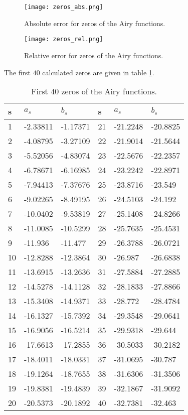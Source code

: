 \documentclass[10pt,a4paper,twocolumn]{article}
\begin{document}
\begin{figure}[h]
\centering
\captionsetup{justification=centering}
\texttt{[image: zeros\_abs.png]}
\caption{Absolute error for zeros of the Airy functions.}
\label{fig:zeros_abs}
\end{figure}

\begin{figure}[h]
\centering
\captionsetup{justification=centering}
\texttt{[image: zeros\_rel.png]}
\caption{Relative error for zeros of the Airy functions.}
\label{fig:zeros_rel}
\end{figure}

The first $40$ calculated zeros are given in table \ref{tab:vals}.

\begin{table}
\begin{tabular}{|l|l|l||l|l|l|}
\hline
s & $a_s$ & $b_s$ & s & $a_s$ & $b_s$\\ \hline \hline
1  & -2.33811 & -1.17371 & 21 & -21.2248 & -20.8825 \\ \hline
2  & -4.08795 & -3.27109 & 22 & -21.9014 & -21.5644 \\ \hline
3  & -5.52056 & -4.83074 & 23 & -22.5676 & -22.2357 \\ \hline
4  & -6.78671 & -6.16985 & 24 & -23.2242 & -22.8971 \\ \hline
5  & -7.94413 & -7.37676 & 25 & -23.8716 & -23.549  \\ \hline
6  & -9.02265 & -8.49195 & 26 & -24.5103 & -24.192  \\ \hline
7  & -10.0402 & -9.53819 & 27 & -25.1408 & -24.8266 \\ \hline
8  & -11.0085 & -10.5299 & 28 & -25.7635 & -25.4531 \\ \hline
9  & -11.936  & -11.477  & 29 & -26.3788 & -26.0721 \\ \hline
10 & -12.8288 & -12.3864 & 30 & -26.987  & -26.6838 \\ \hline
11 & -13.6915 & -13.2636 & 31 & -27.5884 & -27.2885 \\ \hline
12 & -14.5278 & -14.1128 & 32 & -28.1833 & -27.8866 \\ \hline
13 & -15.3408 & -14.9371 & 33 & -28.772  & -28.4784 \\ \hline
14 & -16.1327 & -15.7392 & 34 & -29.3548 & -29.0641 \\ \hline
15 & -16.9056 & -16.5214 & 35 & -29.9318 & -29.644  \\ \hline
16 & -17.6613 & -17.2855 & 36 & -30.5033 & -30.2182 \\ \hline
17 & -18.4011 & -18.0331 & 37 & -31.0695 & -30.787  \\ \hline
18 & -19.1264 & -18.7655 & 38 & -31.6306 & -31.3506 \\ \hline
19 & -19.8381 & -19.4839 & 39 & -32.1867 & -31.9092 \\ \hline
20 & -20.5373 & -20.1892 & 40 & -32.7381 & -32.463  \\ \hline
\end{tabular}
\caption{First $40$ zeros of the Airy functions.}
\label{tab:vals}
\end{table}

\printbibliography
\end{document}
